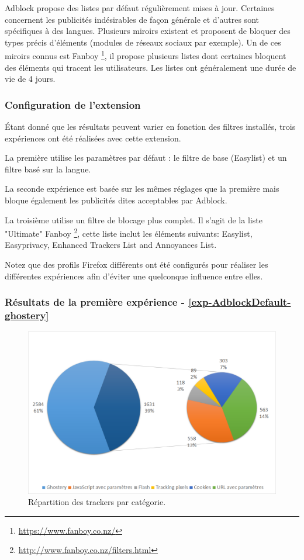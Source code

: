 Adblock propose des listes par défaut régulièrement mises à jour. Certaines concernent les publicités indésirables de façon générale et d'autres sont spécifiques à des langues. Plusieurs miroirs existent et proposent de bloquer des types précis d'éléments (modules de réseaux sociaux par exemple). Un de ces miroirs connus est Fanboy \footnote{\url{https://www.fanboy.co.nz/}}, il propose plusieurs listes dont certaines bloquent des éléments qui tracent les utilisateurs. Les listes ont généralement une durée de vie de 4 jours.

\subsubsection{Configuration de l'extension}
Étant donné que les résultats peuvent varier en fonction des filtres installés, trois expériences ont été réalisées avec cette extension.

La première utilise les paramètres par défaut : le filtre de base (Easylist) et un filtre basé sur la langue.

La seconde expérience est basée sur les mêmes réglages que la première mais bloque également les publicités dites acceptables par Adblock.

La troisième utilise un filtre de blocage plus complet. Il s'agit de la liste "Ultimate" Fanboy \footnote{\url{http://www.fanboy.co.nz/filters.html}}, cette liste inclut les éléments suivants: Easylist, Easyprivacy, Enhanced Trackers List and Annoyances List.

Notez que des profils Firefox différents ont été configurés pour réaliser les différentes expériences afin d'éviter une quelconque influence entre elles.

\subsubsection{Résultats de la première expérience - \autoref{exp-AdblockDefault-ghostery}}
\begin{figure}[!h]
	\centering
	\includegraphics[scale=.6]{resultats/ANALYSES/Images/AdblockDefault-Ghostery.png}
	\caption{\label{exp-AdblockDefault-ghostery}Répartition des trackers par catégorie.}
\end{figure}


